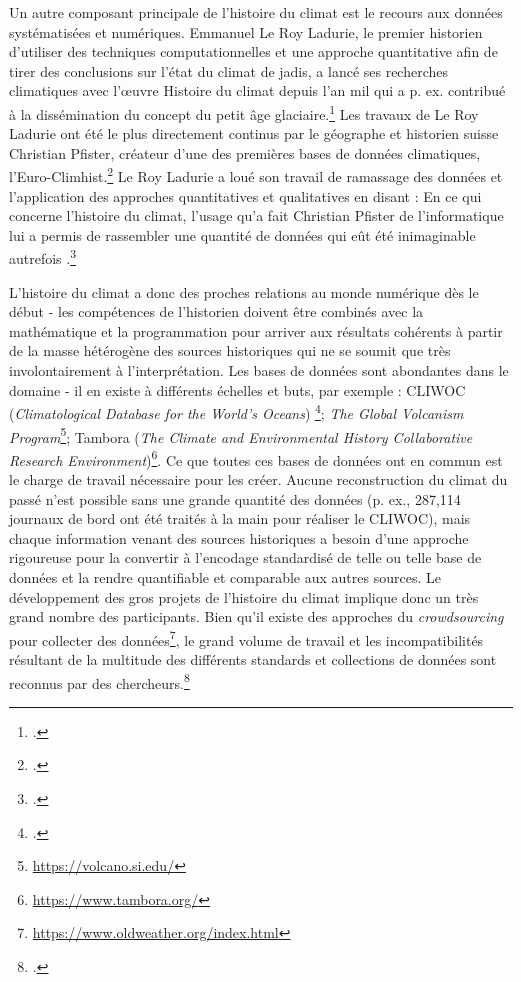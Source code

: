 \documentclass[a4paper,twoside,12pt]{article}
\begin{document}
Un autre composant principale de l'histoire du climat est le recours aux données systématisées et numériques. Emmanuel Le Roy Ladurie, le premier historien d'utiliser des techniques computationnelles et une approche quantitative afin de tirer des conclusions sur l'état du climat de jadis, a lancé ses recherches climatiques avec l'œuvre \og Histoire du climat depuis l'an mil \fg{} qui a p. ex. contribué à la dissémination du concept du petit âge glaciaire.\footcites{le_roy_ladurie_histoire_1967}[Ladurie a continu de s'occuper du climat après dans les années 2000 :][]{le_roy_ladurie_abrege_2007}{le_roy_ladurie_canicules_2005}{le_roy_ladurie_disettes_2006}{le_roy_ladurie_rechauffement_2009} Les travaux de Le Roy Ladurie ont été le plus directement continus par le géographe et historien suisse Christian Pfister, créateur d'une des premières bases de données climatiques, l'Euro-Climhist.\footcite[][]{pfister_christian_euro-climhist_2015} Le Roy Ladurie a loué son travail de ramassage des données et l'application des approches quantitatives et qualitatives en disant : \og En ce qui concerne l’histoire du climat, l’usage qu’a fait Christian Pfister de l’informatique lui a permis de rassembler une quantité de données qui eût été inimaginable autrefois \fg{}.\footcite[168]{le_roy_ladurie_vie_2014}

L'histoire du climat a donc des proches relations au monde numérique dès le début - les compétences de l'historien doivent être combinés avec la mathématique et la programmation pour arriver aux résultats cohérents à partir de la masse hétérogène des sources historiques qui ne se soumit que très involontairement à l'interprétation. Les bases de données sont abondantes dans le domaine - il en existe à différents échelles et buts, par exemple : CLIWOC (\textit{Climatological Database for the World's Oceans}) \footcite{konnen_description_2005}; \textit{The Global Volcanism Program}\footnote{\url{https://volcano.si.edu/}}; Tambora (\textit{The Climate and Environmental History Collaborative Research Environment})\footnote{\url{https://www.tambora.org/}}. Ce que toutes ces bases de données ont en commun est le charge de travail nécessaire pour les créer. Aucune reconstruction du climat du passé n'est possible sans une grande quantité des données (p. ex., 287,114 journaux de bord ont été traités à la main pour réaliser le CLIWOC), mais chaque information venant des sources historiques a besoin d'une approche rigoureuse pour la convertir à l'encodage standardisé de telle ou telle base de données et la rendre quantifiable et comparable aux autres sources. Le développement des gros projets de l'histoire du climat implique donc un très grand nombre des participants.
Bien qu'il existe des approches du \textit{crowdsourcing} pour collecter des données\footnote{\url{https://www.oldweather.org/index.html}}, le grand volume de travail et les incompatibilités résultant de la multitude des différents standards et collections de données sont reconnus par des chercheurs.\footcite{veale_dealing_2017}
\end{document}
